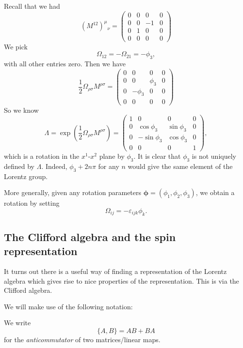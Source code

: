 \documentclass[a4paper]{article}
\begin{document}
\begin{eg}
  Recall that we had
  \[
    (M^{12})^\mu\!_\nu =
    \begin{pmatrix}
      0 & 0 & 0 & 0\\
      0 & 0 & -1 & 0\\
      0 & 1 & 0 & 0\\
      0 & 0 & 0 & 0
    \end{pmatrix}
  \]
  We pick
  \[
    \Omega_{12} = -\Omega_{21} = -\phi_3,
  \]
  with all other entries zero. Then we have
  \[
    \frac{1}{2}\Omega_{\rho\sigma} M^{\rho\sigma} =
    \begin{pmatrix}
      0 & 0 & 0 & 0\\
      0 & 0 & \phi_3 & 0\\
      0 & -\phi_3 & 0 & 0\\
      0 & 0 & 0 & 0
    \end{pmatrix}
  \]
  So we know
  \[
    \Lambda = \exp\left(\frac{1}{2}\Omega_{\rho\sigma} M^{\rho\sigma}\right) =
    \begin{pmatrix}
      1 & 0 & 0 & 0\\
      0 & \cos \phi_3 & \sin \phi_3 & 0\\
      0 & -\sin \phi_3 & \cos \phi_3 & 0\\
      0 & 0 & 0 & 1
    \end{pmatrix},
  \]
  which is a rotation in the $x^1$-$x^2$ plane by $\phi_3$. It is clear that $\phi_3$ is not uniquely defined by $\Lambda$. Indeed, $\phi_3 + 2n \pi$ for any $n$ would give the same element of the Lorentz group.

  More generally, given any rotation parameters $\boldsymbol\phi = (\phi_1, \phi_2, \phi_3)$, we obtain a rotation by setting
  \[
    \Omega_{ij} = - \varepsilon_{ijk} \phi_k.
  \]
\end{eg}

\subsection{The Clifford algebra and the spin representation}
It turns out there is a useful way of finding a representation of the Lorentz algebra which gives rise to nice properties of the representation. This is via the Clifford algebra.

We will make use of the following notation:
\begin{notation}[Anticommutator]
  We write
  \[
    \{A, B\} = AB + BA
  \]
  for the \emph{anticommutator} of two matrices/linear maps.
\end{notation}
\end{document}
